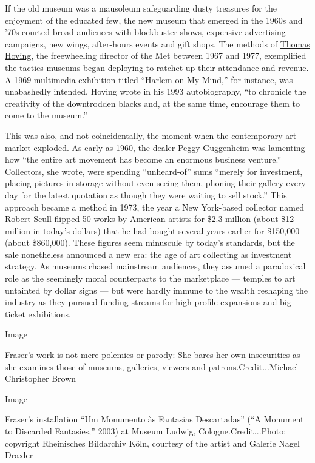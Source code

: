 If the old museum was a mausoleum safeguarding dusty treasures for the
enjoyment of the educated few, the new museum that emerged in the 1960s
and '70s courted broad audiences with blockbuster shows, expensive
advertising campaigns, new wings, after-hours events and gift shops. The
methods of
\href{https://www.nytimes3xbfgragh.onion/topic/person/thomas-hoving}{Thomas
Hoving}, the freewheeling director of the Met between 1967 and 1977,
exemplified the tactics museums began deploying to ratchet up their
attendance and revenue. A 1969 multimedia exhibition titled ``Harlem on
My Mind,'' for instance, was unabashedly intended, Hoving wrote in his
1993 autobiography, ``to chronicle the creativity of the downtrodden
blacks and, at the same time, encourage them to come to the museum.''

This was also, and not coincidentally, the moment when the contemporary
art market exploded. As early as 1960, the dealer Peggy Guggenheim was
lamenting how ``the entire art movement has become an enormous business
venture.'' Collectors, she wrote, were spending ``unheard-of'' sums
``merely for investment, placing pictures in storage without even seeing
them, phoning their gallery every day for the latest quotation as though
they were waiting to sell stock.'' This approach became a method in
1973, the year a New York-based collector named
\href{https://www.nytimes3xbfgragh.onion/1986/01/03/obituaries/robert-scull-prominent-collector-of-pop-art.html}{Robert
Scull} flipped 50 works by American artists for \$2.3 million (about
\$12 million in today's dollars) that he had bought several years
earlier for \$150,000 (about \$860,000). These figures seem minuscule by
today's standards, but the sale nonetheless announced a new era: the age
of art collecting as investment strategy. As museums chased mainstream
audiences, they assumed a paradoxical role as the seemingly moral
counterparts to the marketplace --- temples to art untainted by dollar
signs --- but were hardly immune to the wealth reshaping the industry as
they pursued funding streams for high-profile expansions and big-ticket
exhibitions.

Image

Fraser's work is not mere polemics or parody: She bares her own
insecurities as she examines those of museums, galleries, viewers and
patrons.Credit...Michael Christopher Brown

Image

Fraser's installation ``Um Monumento às Fantasias Descartadas'' (``A
Monument to Discarded Fantasies,'' 2003) at Museum Ludwig,
Cologne.Credit...Photo: copyright Rheinisches Bildarchiv Köln, courtesy
of the artist and Galerie Nagel Draxler

